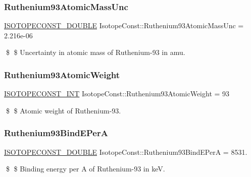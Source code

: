 \subsubsection{\texorpdfstring{Ruthenium93\+Atomic\+Mass\+Unc}{Ruthenium93AtomicMassUnc}}
{\footnotesize\ttfamily \mbox{\hyperlink{group___isotope_const-_macros_ga8f45a7272ce02c0b4c65c44636ed719a}{I\+S\+O\+T\+O\+P\+E\+C\+O\+N\+S\+T\+\_\+\+D\+O\+U\+B\+LE}} Isotope\+Const\+::\+Ruthenium93\+Atomic\+Mass\+Unc = 2.\+216e-\/06}

\$ \$ Uncertainty in atomic mass of Ruthenium-\/93 in amu. \mbox{\label{group___isotope_const-_ruthenium-_ru93_ga491804b39acc55107c7685e5acee7037}} 
\subsubsection{\texorpdfstring{Ruthenium93\+Atomic\+Weight}{Ruthenium93AtomicWeight}}
{\footnotesize\ttfamily \mbox{\hyperlink{group___isotope_const-_macros_ga5f18360b3e99483a35c32d789e62621c}{I\+S\+O\+T\+O\+P\+E\+C\+O\+N\+S\+T\+\_\+\+I\+NT}} Isotope\+Const\+::\+Ruthenium93\+Atomic\+Weight = 93}

\$ \$ Atomic weight of Ruthenium-\/93. \mbox{\label{group___isotope_const-_ruthenium-_ru93_ga664c390e7dd3bff38a66bae3432fcdec}} 
\subsubsection{\texorpdfstring{Ruthenium93\+Bind\+E\+PerA}{Ruthenium93BindEPerA}}
{\footnotesize\ttfamily \mbox{\hyperlink{group___isotope_const-_macros_ga8f45a7272ce02c0b4c65c44636ed719a}{I\+S\+O\+T\+O\+P\+E\+C\+O\+N\+S\+T\+\_\+\+D\+O\+U\+B\+LE}} Isotope\+Const\+::\+Ruthenium93\+Bind\+E\+PerA = 8531.}

\$ \$ Binding energy per A of Ruthenium-\/93 in keV. \mbox{\label{group___isotope_const-_ruthenium-_ru93_ga3364bd4a4c68ffc1a9b8bcb69a197f1c}} 

